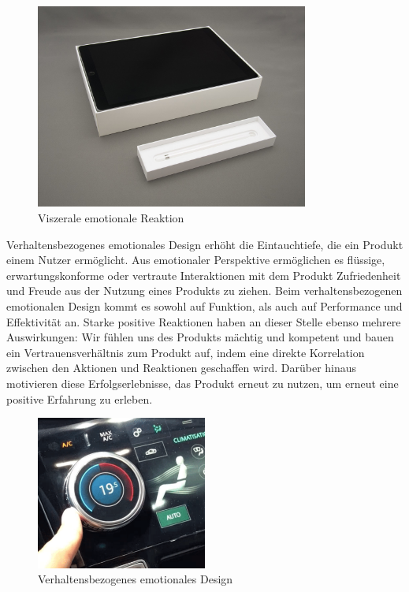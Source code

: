 \documentclass[./dokumentation.tex]{subfiles}
\begin{document}
\begin{figure}[h]
    \centering
    \includegraphics[width=0.8\textwidth]{bilder/ipadbox.jpg}
    \caption{Viszerale emotionale Reaktion\cite*{ipadbox}}
    \label{fig1:visc}
\end{figure}


Verhaltensbezogenes emotionales Design erhöht die Eintauchtiefe, die ein Produkt einem Nutzer ermöglicht. Aus emotionaler Perspektive ermöglichen es flüssige, erwartungskonforme oder vertraute Interaktionen mit dem Produkt Zufriedenheit und Freude aus der Nutzung eines Produkts zu ziehen. Beim verhaltensbezogenen emotionalen Design kommt es sowohl auf Funktion, als auch auf Performance und Effektivität an.
Starke positive Reaktionen haben an dieser Stelle ebenso mehrere Auswirkungen: Wir fühlen uns des Produkts mächtig und kompetent und bauen ein Vertrauensverhältnis zum Produkt auf, indem eine direkte Korrelation zwischen den Aktionen und Reaktionen geschaffen wird. Darüber hinaus motivieren diese Erfolgserlebnisse, das Produkt erneut zu nutzen, um erneut eine positive Erfahrung zu erleben\cite{medium_muz}.\pagebreak


\begin{figure}[h]
    \centering
    \includegraphics[width=0.5\textwidth]{bilder/verh-bez-des.png}
    \caption{Verhaltensbezogenes emotionales Design \cite{medium_muz}}
    \label{fig2:verh}
\end{figure}\\
\end{document}
